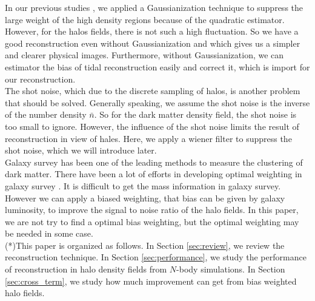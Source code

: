 In our previous studies \citep{2012:pen,2015:zhu}, we applied a
 Gaussianization technique to suppress the large weight of the high density
 regions because of the quadratic estimator. However, for the halos fields, 
 there is not such a high fluctuation. So we have a good reconstruction even
 without Gaussianization and which gives us a simpler and clearer physical
 images. Furthermore, without Gaussianization, we can estimator the bias of
 tidal reconstruction easily and correct it, which is import for our 
 reconstruction. \\
  
The shot noise, which due to the discrete sampling of halos, is another
 problem that should be solved. Generally speaking, we assume the shot
 noise is the inverse of the number density $\bar{n}$. So for the dark matter
 density field, the shot noise is too small to ignore. However, the 
 influence of the shot noise limits the result of reconstruction in view of 
 hales. Here, we apply a wiener filter to suppress the shot noise, which
 we will introduce later.\\
 
Galaxy survey has been one of the leading methods to measure the clustering
of dark matter. There have been a lot of efforts in developing optimal 
weighting in galaxy survey \citep{OW1,OW2,OW3,OW4,OW5}. It is difficult to 
get the mass information in galaxy survey. However we can apply a biased
weighting, that bias can be given by galaxy luminosity, to improve the 
signal to noise ratio of the halo fields. In this paper, we are not try to
find a optimal bias weighting, but the optimal weighting may be needed in
some case.\\

(*)This paper is organized as follows. In Section \ref{sec:review}, 
we review the
 reconstruction technique. In Section \ref{sec:performance},
  we study the performance of
  reconstruction in halo density fields from $N$-body simulations. 
 In Section \ref{sec:cross_term}, we study how much improvement can 
 get from bias weighted halo fields.\\
 